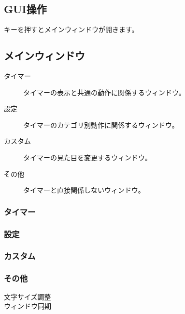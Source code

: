 \documentclass[lualatex,a4paper,fontsize=11pt,jafontscale=0.9247,titlepage,oneside]{jlreq}
\begin{document}
\subsection{GUI操作}
キーを押すとメインウィンドウが開きます。
\subsection{メインウィンドウ}
\begin{description}
\item[\textbullet タイマー]タイマーの表示と共通の動作に関係するウィンドウ。
\item[\textbullet 設定]タイマーのカテゴリ別動作に関係するウィンドウ。
\item[\textbullet カスタム]タイマーの見た目を変更するウィンドウ。
\item[\textbullet その他]タイマーと直接関係しないウィンドウ。
\end{description}
\subsubsection{タイマー}
\subsubsection{設定}
\subsubsection{カスタム}
\subsubsection{その他}
\begin{description}
\item[\textbullet 文字サイズ調整]
\item[\textbullet ウィンドウ同期]
\end{description}
\end{document}
